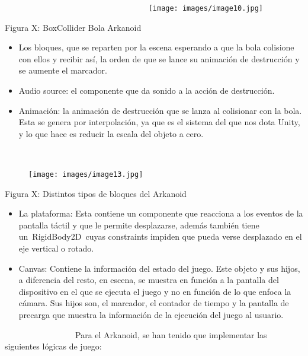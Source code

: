 ~~~~~~~~~~~~~~~~~ ~~~~~~~~~~~~~~~~~\texttt{[image: images/image10.jpg]}

Figura X: BoxCollider Bola Arkanoid

\begin{itemize}
\item
  Los bloques, que se reparten por la escena esperando a que la bola
  colisione con ellos y recibir así, la orden de que se lance su
  animación de destrucción y se aumente el marcador.
\item
  Audio source: el componente que da sonido a la acción de destrucción.
\item
  Animación: la animación de destrucción que se lanza al colisionar con
  la bola. Esta se genera por interpolación, ya que es el sistema del
  que nos dota Unity, y lo que hace es reducir la escala del objeto a
  cero.
\end{itemize}

~~~~~~~~~~~~~~~~~ ~~~~~~~~~~~~~~~~~

\begin{figure}[htbp]
\centering
\texttt{[image: images/image13.jpg]}
\end{figure}

Figura X: Distintos tipos de bloques del Arkanoid

\begin{itemize}
\itemsep1pt\parskip0pt
\item
  La plataforma: Esta contiene un componente que reacciona a los eventos
  de la pantalla táctil y que le permite desplazarse, además también
  tiene un~RigidBody2D~cuyas constraints impiden que pueda verse
  desplazado en el eje vertical o rotado.
\item
  Canvas: Contiene la información del estado del juego. Este objeto y
  sus hijos, a diferencia del resto, en escena, se muestra en función a
  la pantalla del dispositivo en el que se ejecuta el juego y no en
  función de lo que enfoca la cámara. Sus hijos son, el marcador, el
  contador de tiempo y la pantalla de precarga que muestra la
  información de la ejecución del juego al usuario.
\end{itemize}


~~~~~~~~~~~~~~~~~Para el Arkanoid, se han tenido que implementar las
siguientes lógicas de juego:

